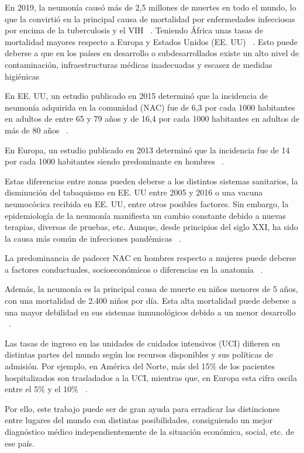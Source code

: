 En 2019, la neumonía causó más de 2,5 millones de muertes en todo el mundo, lo que la convirtió en la principal causa de mortalidad por enfermedades infecciosas por encima de la tuberculosis y el VIH ~\cite{shi2020global}. Teniendo África unas tasas de mortalidad mayores respecto a Europa y Estados Unidos (EE. UU) ~\cite{lim2022pneumonia}. Esto puede deberse a que en los países en desarrollo o subdesarrollados existe un alto nivel de contaminación, infraestructuras médicas inadecuadas y escasez de medidas higiénicas ~\cite{kundu2021pneumonia}

En EE. UU, un estudio publicado en 2015 determinó que la incidencia de neumonía adquirida en la comunidad (NAC) fue de 6,3 por cada 1000 habitantes en adultos de entre 65 y 79 años y de 16,4 por cada 1000 habitantes en adultos de más de 80 años ~\cite{jain2015community}.

En Europa, un estudio publicado en 2013 determinó que la incidencia fue de 14 por cada 1000 habitantes siendo predominante en hombres ~\cite{torres2013risk}. 

Estas diferencias entre zonas pueden deberse a los distintos sistemas sanitarios, la disminución del tabaquismo en EE. UU entre 2005 y 2016 o una vacuna neumocócica recibida en EE. UU, entre otros posibles factores. Sin embargo, la epidemiología de la neumonía manifiesta un cambio constante debido a nuevas terapias, diversas de pruebas, etc. Aunque, desde principios del siglo XXI, ha sido la causa más común de infecciones pandémicas ~\cite{jain2015community}. 

La predominancia de padecer NAC en hombres respecto a mujeres puede deberse a factores conductuales, socioeconómicos o diferencias en la anatomía ~\cite{antoni2021}. 

Además, la neumonía es la principal causa de muerte en niños menores de 5 años, con una mortalidad de 2.400 niños por día. Esta alta mortalidad puede deberse a una mayor debilidad en sus sistemas inmunológicos debido a un menor desarrollo ~\cite{saboo23}.

Las tasas de ingreso en las unidades de cuidados intensivos (UCI) difieren en distintas partes del mundo según los recursos disponibles y sus políticas de admisión. Por ejemplo, en América del Norte, más del 15\% de los pacientes hospitalizados son trasladados a la UCI, mientras que, en Europa esta cifra oscila entre el 5\% y el 10\% ~\cite{lim2022pneumonia}.

Por ello, este trabajo puede ser de gran ayuda para erradicar las distinciones entre lugares del mundo con distintas posibilidades, consiguiendo un mejor diagnóstico médico independientemente de la situación económica, social, etc. de ese país.

